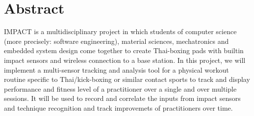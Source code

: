 \chapter*{Abstract}
\label{chap:abstract}
IMPACT is a multidisciplinary project in which students of computer science (more precisely: software engineering), material sciences, mechatronics and embedded system design come together to create Thai-boxing pads with builtin impact sensors and wireless connection to a base station.
In this project, we will implement a multi-sensor tracking and analysis tool for a physical workout routine specific to Thai/kick-boxing or similar contact sports to track and display performance and fitness level of a practitioner over a single and over multiple sessions. It will be used to record and correlate the inputs from impact sensors and technique recognition and track improvemets of practitioners over time.